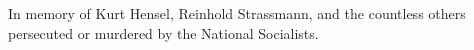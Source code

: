 
%
%
%

\thispagestyle{empty}
\vspace*{3.5cm}
\begin{flushright}

{\large In memory of Kurt Hensel, Reinhold Strassmann, and the countless others persecuted or murdered by the National Socialists.}

\end{flushright}



